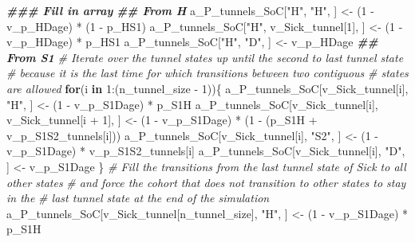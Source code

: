 \documentclass[
]{article}
\newenvironment{Shaded}{\begin{snugshade}}{\end{snugshade}}
\newcommand{\CommentTok}[1]{\textcolor[rgb]{0.56,0.35,0.01}{\textit{#1}}}
\newcommand{\ControlFlowTok}[1]{\textcolor[rgb]{0.13,0.29,0.53}{\textbf{#1}}}
\newcommand{\DecValTok}[1]{\textcolor[rgb]{0.00,0.00,0.81}{#1}}
\newcommand{\DocumentationTok}[1]{\textcolor[rgb]{0.56,0.35,0.01}{\textbf{\textit{#1}}}}
\newcommand{\NormalTok}[1]{#1}
\newcommand{\OtherTok}[1]{\textcolor[rgb]{0.56,0.35,0.01}{#1}}
\newcommand{\SpecialCharTok}[1]{\textcolor[rgb]{0.00,0.00,0.00}{#1}}
\newcommand{\StringTok}[1]{\textcolor[rgb]{0.31,0.60,0.02}{#1}}
\begin{document}
\begin{Shaded}
\begin{Highlighting}[]
\DocumentationTok{\#\#\# Fill in array}
\DocumentationTok{\#\# From H}
\NormalTok{a\_P\_tunnels\_SoC[}\StringTok{"H"}\NormalTok{, }\StringTok{"H"}\NormalTok{, ]              }\OtherTok{\textless{}{-}}\NormalTok{ (}\DecValTok{1} \SpecialCharTok{{-}}\NormalTok{ v\_p\_HDage) }\SpecialCharTok{*}\NormalTok{ (}\DecValTok{1} \SpecialCharTok{{-}}\NormalTok{ p\_HS1)}
\NormalTok{a\_P\_tunnels\_SoC[}\StringTok{"H"}\NormalTok{, v\_Sick\_tunnel[}\DecValTok{1}\NormalTok{], ] }\OtherTok{\textless{}{-}}\NormalTok{ (}\DecValTok{1} \SpecialCharTok{{-}}\NormalTok{ v\_p\_HDage) }\SpecialCharTok{*}\NormalTok{ p\_HS1}
\NormalTok{a\_P\_tunnels\_SoC[}\StringTok{"H"}\NormalTok{, }\StringTok{"D"}\NormalTok{, ]              }\OtherTok{\textless{}{-}}\NormalTok{ v\_p\_HDage}
\DocumentationTok{\#\# From S1}
\CommentTok{\# Iterate over the tunnel states up until the second to last tunnel state }
\CommentTok{\# because it is the last time for which transitions between two contiguous }
\CommentTok{\# states are allowed}
\ControlFlowTok{for}\NormalTok{(i }\ControlFlowTok{in} \DecValTok{1}\SpecialCharTok{:}\NormalTok{(n\_tunnel\_size }\SpecialCharTok{{-}} \DecValTok{1}\NormalTok{))\{}
\NormalTok{  a\_P\_tunnels\_SoC[v\_Sick\_tunnel[i], }\StringTok{"H"}\NormalTok{, ]  }\OtherTok{\textless{}{-}}\NormalTok{ (}\DecValTok{1} \SpecialCharTok{{-}}\NormalTok{ v\_p\_S1Dage) }\SpecialCharTok{*}\NormalTok{ p\_S1H}
\NormalTok{  a\_P\_tunnels\_SoC[v\_Sick\_tunnel[i], }
\NormalTok{                  v\_Sick\_tunnel[i }\SpecialCharTok{+} \DecValTok{1}\NormalTok{], ]   }\OtherTok{\textless{}{-}}\NormalTok{ (}\DecValTok{1} \SpecialCharTok{{-}}\NormalTok{ v\_p\_S1Dage) }\SpecialCharTok{*}
\NormalTok{                                               (}\DecValTok{1} \SpecialCharTok{{-}}\NormalTok{ (p\_S1H }\SpecialCharTok{+}\NormalTok{ v\_p\_S1S2\_tunnels[i]))}
\NormalTok{  a\_P\_tunnels\_SoC[v\_Sick\_tunnel[i], }\StringTok{"S2"}\NormalTok{, ] }\OtherTok{\textless{}{-}}\NormalTok{ (}\DecValTok{1} \SpecialCharTok{{-}}\NormalTok{ v\_p\_S1Dage) }\SpecialCharTok{*}\NormalTok{ v\_p\_S1S2\_tunnels[i]}
\NormalTok{  a\_P\_tunnels\_SoC[v\_Sick\_tunnel[i], }\StringTok{"D"}\NormalTok{, ]  }\OtherTok{\textless{}{-}}\NormalTok{ v\_p\_S1Dage}
\NormalTok{\}}
\CommentTok{\# Fill the transitions from the last tunnel state of Sick to all other states }
\CommentTok{\# and force the cohort that does not transition to other states to stay in the }
\CommentTok{\# last tunnel state at the end of the simulation}
\NormalTok{a\_P\_tunnels\_SoC[v\_Sick\_tunnel[n\_tunnel\_size], }\StringTok{"H"}\NormalTok{, ]  }\OtherTok{\textless{}{-}}\NormalTok{ (}\DecValTok{1} \SpecialCharTok{{-}}\NormalTok{ v\_p\_S1Dage) }\SpecialCharTok{*}\NormalTok{ p\_S1H}

\end{Highlighting}
\end{Shaded}
\end{document}
